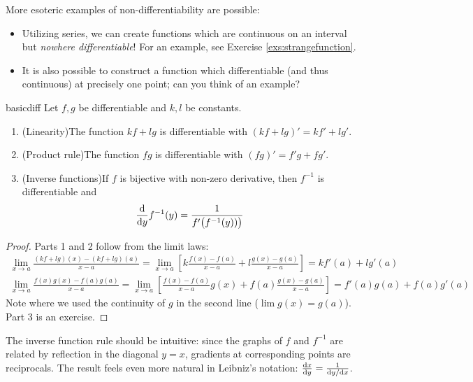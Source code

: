 More esoteric examples of non-differentiability are possible:
\begin{itemize}
  \item Utilizing series, we can create functions which are continuous on an interval but \emph{nowhere differentiable}! For an example, see Exercise \ref{exs:strangefunction}.
  \item It is also possible to construct a function which differentiable (and thus continuous) at precisely one point; can you think of an example?
\end{itemize}

\goodbreak


	
\begin{thm}{}{basicdiff}
	Let $f,g$ be differentiable and $k,l$ be constants.
	\begin{enumerate}
	  \item (Linearity)\quad The function $kf+lg$ is differentiable with $(kf+lg)'=kf'+lg'$.
	  \item (Product rule)\quad The function $fg$ is differentiable with $(fg)'=f'g+fg'$.
	  \item (Inverse functions)\quad If $f$ is bijective with non-zero derivative, then $f^{-1}$ is differentiable and
		\[
			\diff yf^{-1}(y)=\frac 1{f'\big(f^{-1}(y))\big)}
		\] 
	\end{enumerate}
\end{thm}

\begin{proof}
Parts 1 and 2 follow from the limit laws:
\begin{gather*}
	\lim_{x\to a}\frac{(kf+lg)(x)-(kf+lg)(a)}{x-a}=\lim_{x\to a}\left[k\frac{f(x)-f(a)}{x-a}+l\frac{g(x)-g(a)}{x-a}\right]=kf'(a)+lg'(a)\\
	\lim_{x\to a}\frac{f(x)g(x)-f(a)g(a)}{x-a}=\lim_{x\to a}\left[\frac{f(x)-f(a)}{x-a}g(x)+f(a)\frac{g(x)-g(a)}{x-a}\right]=f'(a)g(a)+f(a)g'(a)
\end{gather*}
Note where we used the continuity of $g$ in the second line ($\lim g(x)=g(a)$). Part 3 is an exercise.
\end{proof}

The inverse function rule should be intuitive: since the graphs of $f$ and $f^{-1}$ are related by reflection in the diagonal $y=x$, gradients at corresponding points are reciprocals. The result feels even more natural in Leibniz's notation: $\diff[x]{y}=\frac 1{\dy/\dx}$.

